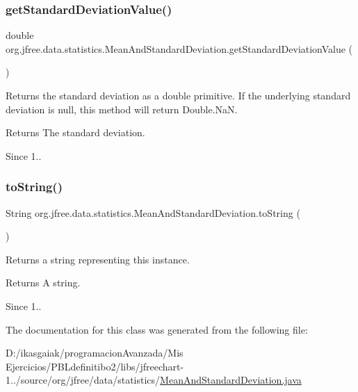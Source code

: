 \subsubsection{\texorpdfstring{get\+Standard\+Deviation\+Value()}{getStandardDeviationValue()}}
{\footnotesize\ttfamily double org.\+jfree.\+data.\+statistics.\+Mean\+And\+Standard\+Deviation.\+get\+Standard\+Deviation\+Value (\begin{DoxyParamCaption}{ }\end{DoxyParamCaption})}

Returns the standard deviation as a double primitive. If the underlying standard deviation is {\ttfamily null}, this method will return {\ttfamily Double.\+NaN}.

\begin{DoxyReturn}{Returns}
The standard deviation.
\end{DoxyReturn}
\begin{DoxySince}{Since}
1.. 
\end{DoxySince}
\mbox{\label{classorg_1_1jfree_1_1data_1_1statistics_1_1_mean_and_standard_deviation_a78a81f05f84f3649082fde42a1eda7ad}} 
\subsubsection{\texorpdfstring{to\+String()}{toString()}}
{\footnotesize\ttfamily String org.\+jfree.\+data.\+statistics.\+Mean\+And\+Standard\+Deviation.\+to\+String (\begin{DoxyParamCaption}{ }\end{DoxyParamCaption})}

Returns a string representing this instance.

\begin{DoxyReturn}{Returns}
A string.
\end{DoxyReturn}
\begin{DoxySince}{Since}
1.. 
\end{DoxySince}


The documentation for this class was generated from the following file\+:\begin{DoxyCompactItemize}
\item 
D\+:/ikasgaiak/programacion\+Avanzada/\+Mis Ejercicios/\+P\+B\+Ldefinitibo2/libs/jfreechart-\/1../source/org/jfree/data/statistics/\mbox{\hyperlink{_mean_and_standard_deviation_8java}{Mean\+And\+Standard\+Deviation.\+java}}\end{DoxyCompactItemize}
